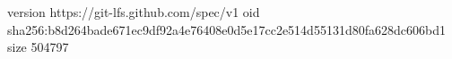 version https://git-lfs.github.com/spec/v1
oid sha256:b8d264bade671ec9df92a4e76408e0d5e17cc2e514d55131d80fa628dc606bd1
size 504797
